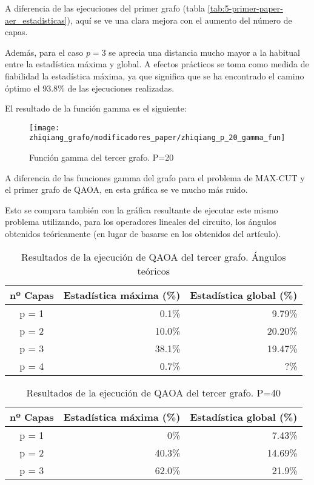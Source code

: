 \documentclass{article}
\begin{document}
A diferencia de las ejecuciones del primer grafo (tabla \ref{tab:5-primer-paper-aer_estadisticas}), aquí se ve una clara mejora con el aumento del número de capas.

Además, para el caso \(p = 3\) se aprecia una distancia mucho mayor a la habitual entre la estadística máxima y global. A efectos prácticos se toma como medida de fiabilidad la estadística máxima, ya que significa que se ha encontrado el camino óptimo el 93.8\% de las ejecuciones realizadas.

El resultado de la función gamma es el siguiente:
\begin{figure}[htbp]
  \centering
  \texttt{[image: zhiqiang\_grafo/modificadores\_paper/zhiqiang\_p\_20\_gamma\_fun]}
  \caption{Función gamma del tercer grafo. P=20}
\end{figure}
A diferencia de las funciones gamma del grafo para el problema de MAX-CUT y el primer grafo de QAOA, en esta gráfica se ve mucho más ruido.

Esto se compara también con la gráfica resultante de ejecutar este mismo problema utilizando, para los operadores lineales del circuito, los ángulos obtenidos teóricamente (en lugar de basarse en los obtenidos del artículo).

\begin{table}[htbp]
  \centering
  \begin{tabular}{|c|r|r|}
    \hline
    \textbf{nº Capas} & \textbf{Estadística máxima (\%)} & \textbf{Estadística global (\%)} \\ \hline
    p = 1 &  0.1\% &  9.79\% \\ \hline
    p = 2 & 10.0\% & 20.20\% \\ \hline
    p = 3 & 38.1\% & 19.47\% \\ \hline
    p = 4 &  0.7\% &     ?\% \\ \hline  %
  \end{tabular}
  \caption{Resultados de la ejecución de QAOA del tercer grafo. Ángulos teóricos}
\end{table}

\begin{table}[htbp]
  \centering
  \begin{tabular}{|c|r|r|}
    \hline
    \textbf{nº Capas} & \textbf{Estadística máxima (\%)} & \textbf{Estadística global (\%)} \\ \hline
    p = 1 &    0\% &  7.43\% \\ \hline
    p = 2 & 40.3\% & 14.69\% \\ \hline
    p = 3 & 62.0\% &  21.9\% \\ \hline
  \end{tabular}
  \caption{Resultados de la ejecución de QAOA del tercer grafo. P=40}
\end{table}
\end{document}
